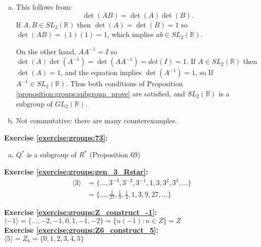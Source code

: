 \begin{enumerate}[(a)]
\item
This follows from:
$$\det(AB) = \det(A) \det(B).$$
If $A,B \in  SL_2({\mathbb R})$ then $\det(A) = \det(B) = 1$ so $\det(AB) = (1)(1) = 1$, which implies $ab \in SL_2({\mathbb R})$.

On the other hand, $A A^{-1} = I$ so $\det(A)\det(A^{-1}) = \det(AA^{-1}) = det(I) = 1.$ If $A \in  SL_2({\mathbb R})$ then $\det(A)=1$, and the equation implies $\det(A^{-1}) = 1$, so If $A^{-1} \in  SL_2({\mathbb R})$. Thus both conditions of Proposition \ref{proposition:groups:subgroup_prove} are satisfied, and $SL_2({\mathbb R})$ is a subgroup of $GL_2({\mathbb R})$.

\item
Not commutative: there are many counterexamples.
\end{enumerate}

\noindent\textbf{Exercise \ref{exercise:groups:73}:}
\begin{enumerate}[(a)]
\item
$Q^*$ is a subgroup of $R^*$ (Proposition 69)\\
\end{enumerate}

\noindent\textbf{Exercise \ref{exercise:groups:gen_3_Rstar}:}
\begin{align*}
\langle 3 \rangle &= \{ \ldots, 3^{-3}, 3^{-2}, 3^{-1}, 1, 3, 3^2, 3^3, \ldots \}\\
&= \{ \ldots, \frac{1}{27}, \frac{1}{9}, \frac{1}{3}, 1, 3, 9, 27, \ldots \}
\end{align*}

\noindent\textbf{Exercise \ref{exercise:groups:Z_construct_-1}:}\\
$\langle-1\rangle=\{...,-2,-1,0,1,-1,-2\}=\{n(-1):n\in Z\}=Z$\\

\noindent\textbf{Exercise \ref{exercise:groups:Z6_construct_5}:}\\
$\langle 5\rangle=Z_6=\{0,1,2,3,4,5\}$\\

